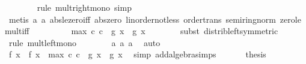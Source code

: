 \begin{isabellebody}
\ \ \ \ \ \ \isamarkupfalse%
\ {\isacharparenleft}{\kern0pt}rule\ mult{\isacharunderscore}{\kern0pt}right{\isacharunderscore}{\kern0pt}mono{\isacharcomma}{\kern0pt}\ simp{\isacharparenright}{\kern0pt}\isanewline
\ \ \ \ \ \ \isamarkupfalse%
\ {\isacharparenleft}{\kern0pt}metis\ a\ a{}\ abs{\isacharunderscore}{\kern0pt}le{\isacharunderscore}{\kern0pt}zero{\isacharunderscore}{\kern0pt}iff\ abs{\isacharunderscore}{\kern0pt}zero\ linorder{\isacharunderscore}{\kern0pt}not{\isacharunderscore}{\kern0pt}less\ order{\isacharunderscore}{\kern0pt}trans\ semiring{\isacharunderscore}{\kern0pt}norm{\isacharparenleft}{\kern0pt}{}{}{\isacharparenright}{\kern0pt}\ zero{\isacharunderscore}{\kern0pt}le{\isacharunderscore}{\kern0pt}mult{\isacharunderscore}{\kern0pt}iff{\isacharparenright}{\kern0pt}\isanewline
\ \ \ \ \isamarkupfalse%
\ \isamarkupfalse%
\ {\isachardoublequoteopen}{\isachardot}{\kern0pt}{\isachardot}{\kern0pt}{\isachardot}{\kern0pt}\ {\isasymle}\ max\ c{}\ c{}\ {\isacharasterisk}{\kern0pt}\ {\isacharparenleft}{\kern0pt}{\isasymbar}g{}\ x\ {\isacharplus}{\kern0pt}\ g{}\ x{\isasymbar}{\isacharparenright}{\kern0pt}{\isachardoublequoteclose}\isanewline
\ \ \ \ \ \ \isamarkupfalse%
\ {\isacharparenleft}{\kern0pt}subst\ distrib{\isacharunderscore}{\kern0pt}left{\isacharbrackleft}{\kern0pt}symmetric{\isacharbrackright}{\kern0pt}{\isacharparenright}{\kern0pt}\isanewline
\ \ \ \ \ \ \isamarkupfalse%
\ {\isacharparenleft}{\kern0pt}rule\ mult{\isacharunderscore}{\kern0pt}left{\isacharunderscore}{\kern0pt}mono{\isacharparenright}{\kern0pt}\isanewline
\ \ \ \ \ \ \isamarkupfalse%
\ a\ a{}\ a{}\ \isamarkupfalse%
\ auto\isanewline
\ \ \ \ \isamarkupfalse%
\ \isamarkupfalse%
\ {\isachardoublequoteopen}{\isasymbar}f{}\ x\ {\isacharplus}{\kern0pt}\ f{}\ x{\isasymbar}\ {\isasymle}\ max\ c{}\ c{}\ {\isacharasterisk}{\kern0pt}\ {\isasymbar}g{}\ x\ {\isacharplus}{\kern0pt}\ g{}\ x{\isasymbar}{\isachardoublequoteclose}\ \isamarkupfalse%
\ {\isacharparenleft}{\kern0pt}simp\ add{\isacharcolon}{\kern0pt}algebra{\isacharunderscore}{\kern0pt}simps{\isacharparenright}{\kern0pt}\isanewline
\ \ \isamarkupfalse%
\isanewline
\ \ \isamarkupfalse%
\ {\isacharquery}{\kern0pt}thesis\isanewline
\ \ \ \ \isamarkupfalse%

\end{isabellebody}
